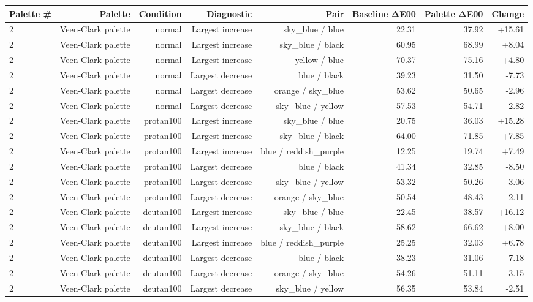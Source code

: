 \begin{tabular}{lrrrrrrr}
\toprule
Palette \# & Palette & Condition & Diagnostic & Pair & Baseline ΔE00 & Palette ΔE00 & Change \\
\midrule
2 & Veen-Clark palette & normal & Largest increase & sky\_blue / blue & 22.31 & 37.92 & +15.61 \\
2 & Veen-Clark palette & normal & Largest increase & sky\_blue / black & 60.95 & 68.99 & +8.04 \\
2 & Veen-Clark palette & normal & Largest increase & yellow / blue & 70.37 & 75.16 & +4.80 \\
2 & Veen-Clark palette & normal & Largest decrease & blue / black & 39.23 & 31.50 & -7.73 \\
2 & Veen-Clark palette & normal & Largest decrease & orange / sky\_blue & 53.62 & 50.65 & -2.96 \\
2 & Veen-Clark palette & normal & Largest decrease & sky\_blue / yellow & 57.53 & 54.71 & -2.82 \\
2 & Veen-Clark palette & protan100 & Largest increase & sky\_blue / blue & 20.75 & 36.03 & +15.28 \\
2 & Veen-Clark palette & protan100 & Largest increase & sky\_blue / black & 64.00 & 71.85 & +7.85 \\
2 & Veen-Clark palette & protan100 & Largest increase & blue / reddish\_purple & 12.25 & 19.74 & +7.49 \\
2 & Veen-Clark palette & protan100 & Largest decrease & blue / black & 41.34 & 32.85 & -8.50 \\
2 & Veen-Clark palette & protan100 & Largest decrease & sky\_blue / yellow & 53.32 & 50.26 & -3.06 \\
2 & Veen-Clark palette & protan100 & Largest decrease & orange / sky\_blue & 50.54 & 48.43 & -2.11 \\
2 & Veen-Clark palette & deutan100 & Largest increase & sky\_blue / blue & 22.45 & 38.57 & +16.12 \\
2 & Veen-Clark palette & deutan100 & Largest increase & sky\_blue / black & 58.62 & 66.62 & +8.00 \\
2 & Veen-Clark palette & deutan100 & Largest increase & blue / reddish\_purple & 25.25 & 32.03 & +6.78 \\
2 & Veen-Clark palette & deutan100 & Largest decrease & blue / black & 38.23 & 31.06 & -7.18 \\
2 & Veen-Clark palette & deutan100 & Largest decrease & orange / sky\_blue & 54.26 & 51.11 & -3.15 \\
2 & Veen-Clark palette & deutan100 & Largest decrease & sky\_blue / yellow & 56.35 & 53.84 & -2.51 \\

\end{tabular}
